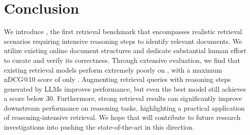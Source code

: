 \vspace{-10pt}
\section{Conclusion}
\label{tab:conclusion}
We introduce \ours, the first retrieval benchmark that encompasses realistic retrieval scenarios requiring intensive reasoning steps to identify relevant documents. 
We utilize existing online document structures and dedicate substantial human effort to curate \ours and verify its correctness. 
Through extensive evaluation, we find that existing retrieval models perform extremely poorly on \ours, with a maximum nDCG@10 score of only \bestperformance. 
Augmenting retrieval queries with reasoning steps generated by LLMs improves performance, but even the best model still achieves a score below 30. 
Furthermore, strong retrieval results can significantly improve downstream performance on reasoning tasks, highlighting a practical application of reasoning-intensive retrieval.
We hope that \ours will contribute to future research investigations into pushing the state-of-the-art in this direction.